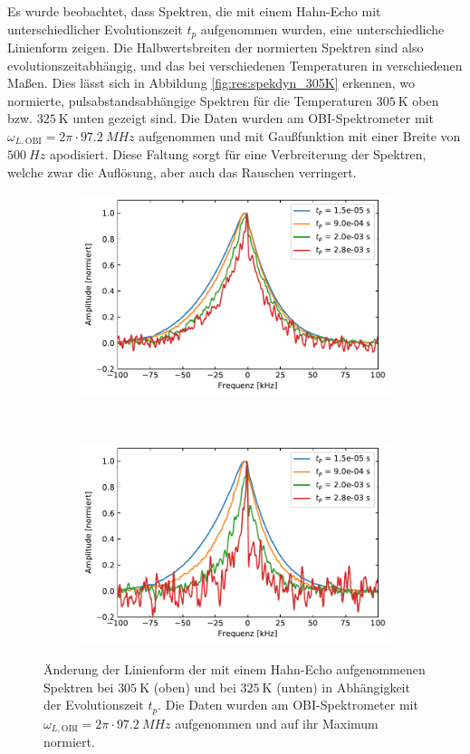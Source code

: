 Es wurde beobachtet, dass Spektren, die mit einem Hahn-Echo mit unterschiedlicher Evolutionszeit $t_p$ aufgenommen wurden, eine unterschiedliche Linienform zeigen. Die Halbwertsbreiten der normierten Spektren sind also evolutionszeitabhängig, und das bei verschiedenen Temperaturen in verschiedenen Maßen. Dies lässt sich in Abbildung \ref{fig:res:spekdyn_305K} erkennen, wo normierte, pulsabstandsabhängige Spektren für die Temperaturen $\SI{305}{\kelvin}$ oben bzw. $\SI{325}{\kelvin}$ unten gezeigt sind. Die Daten wurden am OBI-Spektrometer mit $\omega_{L, \text{OBI}} = 2\pi \cdot \SI{97.2}{MHz}$ aufgenommen und mit Gaußfunktion mit einer Breite von $\SI{500}{Hz}$ apodisiert. Diese Faltung sorgt für eine Verbreiterung der Spektren, welche zwar die Auflösung, aber auch das Rauschen verringert.
\begin{figure}
	\centering
	\begin{subfigure}{\textwidth}
		\centering
		\includegraphics[width=.9\textwidth]{graphics/plot/spekdyn_305K2.pdf}
	\end{subfigure} \\
	\begin{subfigure}{\textwidth}
		\centering
		\includegraphics[width=.9\textwidth]{graphics/plot/spekdyn_325K2.pdf}
	\end{subfigure}
	\caption{Änderung der Linienform der mit einem Hahn-Echo aufgenommenen Spektren bei $\SI{305}{\kelvin}$ (oben) und bei $\SI{325}{\kelvin}$ (unten) in Abhängigkeit der Evolutionszeit $t_p$. Die Daten wurden am OBI-Spektrometer mit $\omega_{L, \text{OBI}} = 2\pi \cdot \SI{97.2}{MHz}$ aufgenommen und auf ihr Maximum normiert.}
	\label{fig:res:spekdyn_305K}
	\label{fig:res:spekdyn_325K}
\end{figure}

